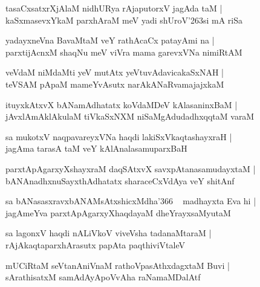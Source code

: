 \documentclass[twoside,12pt,openright]{book}
\def\S{\char'263}
\newcounter{shloka}[chapter]
\begin{document}
\begin{shloka}%
tasaCxsatxrXjAlaM nidhURya rAjaputorxV jagAda taM |\\
kaSxmasevxYkaM parxhAraM meV yadi shUroV\S si mA riSa
\end{shloka}

\begin{shloka}%
yadayxneVna BavaMtaM veY rathAcaCx patayAmi na |\\
parxtijAcnxM shaqNu meV viVra mama garevxVNa nimiRtAM 
\end{shloka}

\begin{shloka}%
veVdaM niMdaMti yeV mutAtx yeVtuvAdavicakaSxNAH |\\
teVSAM pApaM mameYvAsutx narAkANaRvamajajxkaM 
\end{shloka}

\begin{shloka}%
ituyxkAtxvX bANamAdhatatx koVdaMDeV kAlasaninxBaM |\\
jAvxlAmAklAkulaM tiVkaSxNXM niSaMgAdudadhxqqtaM varaM
\end{shloka}

\begin{shloka}%
sa mukotxV naqpavareyxVNa haqdi lakiSxVkaqtashayxraH |\\
jagAma tarasA taM veY kAlAnalasamuparxBaH
\end{shloka}

\begin{shloka}%
parxtApAgarxyXshayxraM daqSAtxvX savxpAtanasamudayxtaM |\\
bANAnadhxnuSayxthAdhatatx sharaceCxVdAya veY shitAnf
\end{shloka}

\begin{shloka}%
sa bANasasxravxbANAMsAtxshicxMdha\char'366 ~ madhayxta Eva hi |\\
jagAmeYva parxtApAgarxyXhaqdayaM dheYrayxsaMyutaM 
\end{shloka}

\begin{shloka}%
sa lagonxV haqdi nALiVkoV viveVsha tadanaMtaraM |\\
rAjAkaqtaparxhArasutx papAta paqthiviVtaleV 
\end{shloka}

\begin{shloka}%
mUCiRtaM seVtanAniVnaM rathoVpasAthxdagxtaM Buvi |\\
sArathisatxM samAdAyApoVvAha raNamaMDalAtf 
\end{shloka}
\end{document}
